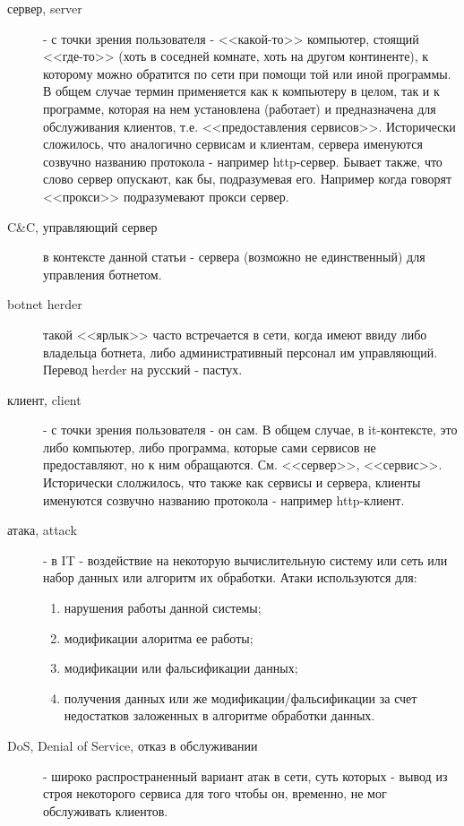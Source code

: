\begin{description}
\item[сервер, server]
 - с точки зрения пользователя - <<какой-то>> компьютер, стоящий
<<где-то>> (хоть в соседней комнате, хоть на другом континенте), к которому
можно обратится по сети при помощи той или иной программы. В общем случае
термин применяется как к компьютеру в целом, так и к программе, которая на
нем установлена (работает) и предназначена для обслуживания клиентов, т.е.
<<предоставления сервисов>>.  Исторически сложилось, что аналогично сервисам
и клиентам, сервера именуются созвучно названию протокола - например http-сервер.
Бывает также, что слово сервер опускают, как бы, подразумевая его. Например
когда говорят <<прокси>> подразумевают прокси сервер.

\item[C\&C, управляющий сервер]
в контексте данной статьи - сервера (возможно не единственный) для управления ботнетом.

\item[botnet herder]
такой <<ярлык>> часто встречается в сети, когда имеют ввиду либо владельца ботнета, либо административный
 персонал им управляющий. Перевод herder на русский - пастух.

\item[клиент, client]
 - с точки зрения пользователя - он сам. В общем случае,
в it-контексте, это либо компьютер, либо программа, которые сами сервисов
не предоставляют, но к ним обращаются. См. <<сервер>>, <<сервис>>.
Исторически слолжилось, что также как сервисы и сервера, клиенты именуются
созвучно названию протокола - например http-клиент.

\item[атака, attack]
 - в IT -  воздействие на некоторую вычислительную систему или сеть
или набор данных или алгоритм их обработки. Атаки используются для:
\begin{enumerate}
\item{нарушения работы данной
системы;}
\item{модификации алоритма
ее работы;}
\item{модификации или фальсификации данных;}
\item{получения данных или же модификации/фальсификации за счет
 недостатков заложенных в алгоритме обработки данных.}
\end{enumerate}

\item[DoS, Denial of Service, отказ в обслуживании ]
 - широко распространенный вариант атак
в сети, суть которых - вывод из строя некоторого сервиса для того чтобы он,
временно, не мог обслуживать клиентов.



\end{description}
